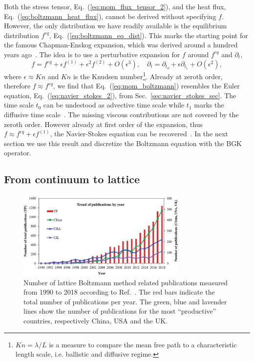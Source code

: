 Both the stress tensor, Eq.~(\ref{eq:mom_flux_tensor_2}), and the heat flux, Eq.~(\ref{eq:boltzmann_heat_flux}), cannot be derived without specifying $f$.
However, the only distribution we have readily available is the equilibrium distribution $f^{eq}$, Eq.~(\ref{eq:boltzmann_eq_dist}).
This marks the starting point for the famous Chapman-Enskog expansion, which was derived around a hundred years ago~\cite{chapmanMathematicalTheoryNonuniform1990, enskogKinetischeTheorieVorgange1917}. 
The idea is to use a perturbative expansion for $f$ around $f^{eq}$ and $\partial_t$, 
\begin{equation}\label{eq:chap-ens-expansion}
    f = f^{eq} + \epsilon f^{(1)} + \epsilon^2 f^{(2)} + O(\epsilon^3),\quad \partial_t = \partial_{t_0} + \epsilon\partial_{t_1} + O(\epsilon^2),
\end{equation}
where $\epsilon\approx Kn$ and $Kn$ is the Knudsen number\footnote{$Kn = \lambda/L$ is a measure to compare the mean free path to a characteristic length scale, i.e. ballistic and diffusive regime.}. 
Already at zeroth order, therefore $f \approx f^{eq}$, we find that Eq.~(\ref{eq:mom_boltzmann}) resembles the Euler equation, Eq.~(\ref{eq:navier_stokes_2}), from Sec.~\ref{sec:navier_stokes_sec}.
The time scale $t_0$ can be undestood as advective time scale while $t_1$ marks the diffusive time scale~\cite{dellarNonhydrodynamicModesPriori2002}.
The missing viscous contributions are not covered by the zeroth order.
However already at first order of the expansion, thus $f\approx f^{eq} + \epsilon f^{(1)}$, the Navier-Stokes equation can be recovered~\cite{chenLatticeBoltzmannMethod1998}.
In the next section we use this result and discretize the Boltzmann equation with the BGK operator.

\subsection{From continuum to lattice} 
\begin{figure}
    \centering
    \includegraphics[width=0.75\textwidth]{graphics/lbm_citations.pdf}
    \caption{Number of lattice Boltzmann method related publications measured from 1990 to 2018 according to Ref.~\cite{liLatticeBoltzmannMethod2020}.
    The red bars indicate the total number of publications per year. 
    The green, blue and lavender lines show the number of publications for the most ``productive'' countries, respectively China, USA and the UK.}
    \label{fig:lbm_cite}
\end{figure}

